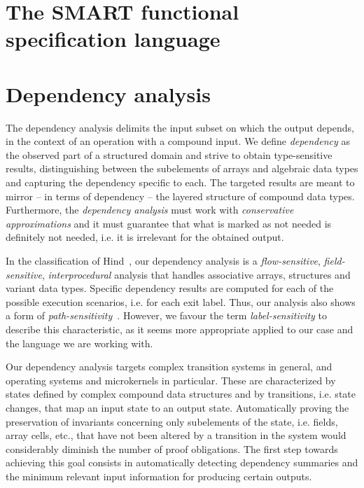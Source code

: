 \documentclass[11pt]{article}
\begin{document}
\section{The SMART functional specification language}

\section{Dependency analysis}



The dependency analysis delimits the input subset on which the output
depends, in the context of an operation with a compound input. We
define \emph{dependency} as the observed part of a structured domain
and strive to obtain type-sensitive results, distinguishing between
the subelements of arrays and algebraic data types and capturing the
dependency specific to each. The targeted results are meant to mirror
-- in terms of dependency -- the layered structure of compound data
types.  Furthermore, the \emph{dependency analysis} must work with
\emph{conservative approximations} and it must guarantee that what is
marked as not needed is definitely not needed, i.e. it is irrelevant
for the obtained output.

In the classification of Hind~\cite{hind01}, our dependency analysis is a 
\emph{flow-sensitive}, \emph{field-sensitive}, \emph{interprocedural} analysis
that handles associative arrays, structures and variant data types. Specific
dependency results are computed for each of the possible execution
scenarios, i.e. for each exit label. Thus, our analysis also shows a form of
\emph{path-sensitivity}~\cite{hind01}. However, we favour the term 
\emph{label-sensitivity} to describe this characteristic, as it seems more 
appropriate applied to our case and the language we are working with.

Our dependency analysis targets complex transition systems in general, and 
operating systems and microkernels in particular.
These are
characterized by states defined by complex compound data structures and by 
transitions, i.e. state changes, that map an input state to an output state. 
Automatically proving the preservation of invariants concerning only 
subelements of the state, i.e. fields, array cells, etc., that have not been 
altered by a transition in the system would considerably diminish the number of 
proof obligations. The first step towards achieving this goal consists in 
automatically detecting dependency summaries and the minimum relevant input
information for producing certain outputs.
\end{document}
